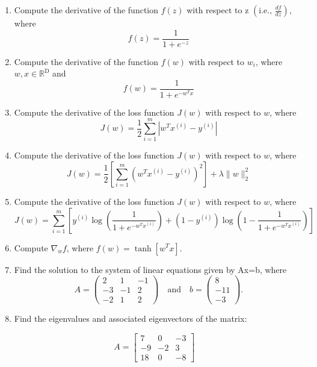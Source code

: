 \documentclass[11pt]{article}
\begin{document}
\begin{enumerate}
\item Compute the derivative of the function $f(z)$ with respect to z $\left(\text{i.e., }\frac{df}{dz}\right)$, where $$f(z) = \frac{1}{1+e^{-z}}$$

\item Compute the derivative of the function $f(w)$ with respect to $w_i$, where $w, x \in \mathbb{R}^\text{D}$ and $$f(w) = \frac{1}{1+e^{-w^Tx}}$$

\item Compute the derivative of the loss function $J(w)$ with respect to $w$, where 
$$ J(w) = \frac{1}{2}\sum_{i=1}^{m} \left|w^{T}x^{(i)} - y^{(i)}\right| $$

\item Compute the derivative of the loss function $J(w)$ with respect to $w$, where 
$$ J(w) = \frac{1}{2}\left[ \sum_{i=1}^{m} \left(w^{T}x^{(i)} - y^{(i)}\right)^2 \right] + \lambda \|w\|^2_2 $$ 

\item Compute the derivative of the loss function $J(w)$ with respect to $w$, where 
$$ J(w) = \sum_{i=1}^{m} \left[y^{(i)} \log \left(\frac{1}{1 + e^{-w^{T}x^{(i)}}}\right) + \left(1 - y^{(i)}\right) \log \left(1- \frac{1}{1 + e^{-w^{T}x^{(i)}}}\right)\right] $$

\item Compute $\nabla_wf$, where $f(w) = \tanh \left[w^Tx\right]$.
	   
\item Find the solution to the system of linear equations given by Ax=b, where 
$$A = \left(\begin{array}{rrr} 2 & 1 & -1\\ -3 & -1 & 2 \\ -2 & 1 & 2 \end{array}\right) \quad \text{and} \quad b = \left(\begin{array}{r} 8 \\ -11 \\ -3 \end{array}\right).$$

\item Find the eigenvalues and associated eigenvectors of the matrix:

$$A = \left[\begin{array}{rrr} 7 & 0 & -3\\ -9 & -2 & 3 \\ 18 & 0 & -8 \end{array}\right] \quad $$


\end{enumerate}
\end{document}
